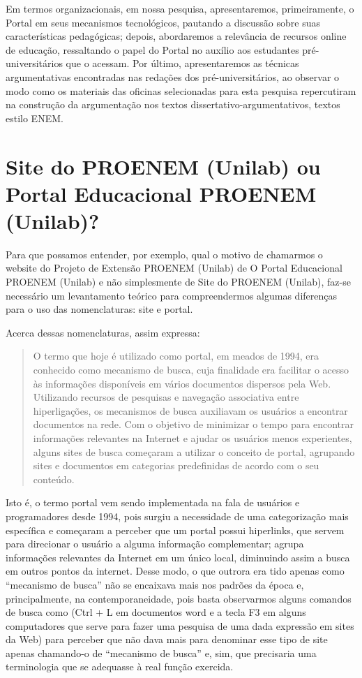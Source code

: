 \documentclass{textolivre}
\newcounter{quote}
\begin{document}
Em termos organizacionais, em nossa pesquisa, apresentaremos, primeiramente, o Portal em seus mecanismos tecnológicos, pautando a discussão sobre suas características pedagógicas; depois, abordaremos a relevância de recursos online de educação, ressaltando o papel do Portal no auxílio aos estudantes pré-universitários que o acessam. Por último, apresentaremos as técnicas argumentativas encontradas nas redações dos pré-universitários, ao observar o modo como os materiais das oficinas selecionadas para esta pesquisa repercutiram na construção da argumentação nos textos dissertativo-argumentativos, textos estilo ENEM.

\section{Site do PROENEM (Unilab) ou Portal Educacional PROENEM (Unilab)?}
Para que possamos entender, por exemplo, qual o motivo de chamarmos o website do Projeto de Extensão PROENEM (Unilab) de O Portal Educacional PROENEM (Unilab) e não simplesmente de Site do PROENEM (Unilab), faz-se necessário um levantamento teórico para compreendermos algumas diferenças para o uso das nomenclaturas: site e portal.
 
Acerca dessas nomenclaturas, \textcite[p. 118]{bottentuitjunior2013} assim expressa:

\begin{quote}
O termo que hoje é utilizado como portal, em meados de 1994, era conhecido como mecanismo de busca, cuja finalidade era facilitar o acesso às informações disponíveis em vários documentos dispersos pela Web. Utilizando recursos de pesquisas e navegação associativa entre hiperligações, os mecanismos de busca auxiliavam os usuários a encontrar documentos na rede. Com o objetivo de minimizar o tempo para encontrar informações relevantes na Internet e ajudar os usuários menos experientes, alguns sites de busca começaram a utilizar o conceito de portal, agrupando sites e documentos em categorias predefinidas de acordo com o seu conteúdo.
\end{quote}

Isto é, o termo portal vem sendo implementada na fala de usuários e programadores desde 1994, pois surgiu a necessidade de uma categorização mais específica e começaram a perceber que um portal possui hiperlinks, que servem para direcionar o usuário a alguma informação complementar; agrupa informações relevantes da Internet em um único local, diminuindo assim a busca em outros pontos da internet. Desse modo, o que outrora era tido apenas como “mecanismo de busca” não se encaixava mais nos padrões da época e, principalmente, na contemporaneidade, pois basta observarmos alguns comandos de busca como (Ctrl + L em documentos word e a tecla F3 em alguns computadores que serve para fazer uma pesquisa de uma dada expressão em sites da Web) para perceber que não dava mais para denominar esse tipo de site apenas chamando-o de “mecanismo de busca” e, sim, que precisaria uma terminologia que se adequasse à real função exercida.
\end{document}
